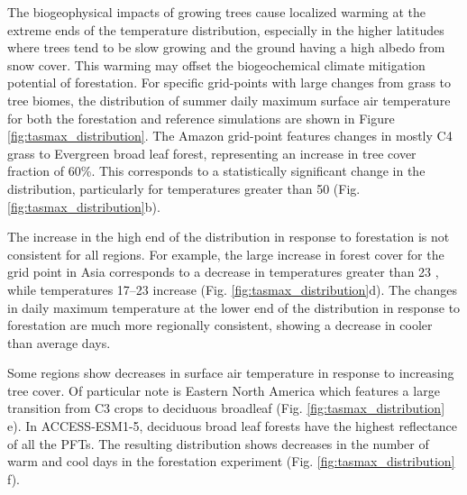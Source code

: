 \documentclass[]{article}
\begin{document}
The biogeophysical impacts of growing trees cause localized warming at the extreme ends of the temperature distribution, especially in the higher latitudes where trees tend to be slow growing and the ground having a high albedo from snow cover.
This warming may offset the biogeochemical climate mitigation potential of forestation.
For specific grid-points with large changes from grass to tree biomes, the distribution of summer daily maximum surface air temperature for both the forestation and reference simulations are shown in Figure \ref{fig:tasmax_distribution}.
The Amazon grid-point features changes in mostly C4 grass to Evergreen broad leaf forest, representing an increase in tree cover fraction of 60\%.
This corresponds to a statistically significant change in the distribution, particularly for temperatures greater than 50 \textcelsius{} (Fig. \ref{fig:tasmax_distribution}b).

The increase in the high end of the distribution in response to forestation is not consistent for all regions.
For example, the large increase in forest cover for the grid point in Asia corresponds to a decrease in temperatures greater than 23 \textcelsius{}, while temperatures 17--23 \textcelsius{} increase (Fig. \ref{fig:tasmax_distribution}d).
The changes in daily maximum temperature at the lower end of the distribution in response to forestation are much more regionally consistent, showing a decrease in cooler than average days.

Some regions show decreases in surface air temperature in response to increasing tree cover.
Of particular note is Eastern North America which features a large transition from C3 crops to deciduous broadleaf (Fig. \ref{fig:tasmax_distribution} e).
In ACCESS-ESM1-5, deciduous broad leaf forests have the highest reflectance of all the PFTs.
The resulting distribution shows decreases in the number of warm and cool days in the forestation experiment (Fig. \ref{fig:tasmax_distribution} f).
\end{document}

